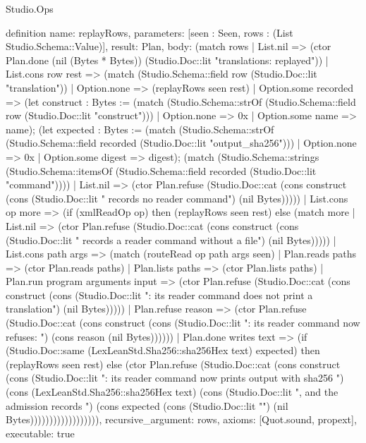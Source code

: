 \begin{lexlean}{Studio.Ops}
\begin{semanticmodule}
{definition{
  name: replayRows,
  parameters: [seen : Seen, rows : (List Studio.Schema::Value)],
  result: Plan,
  body: (match rows
    | List.nil => (ctor Plan.done (nil (Bytes * Bytes)) (Studio.Doc::lit "translations: replayed\n"))
    | List.cons row rest => (match (Studio.Schema::field row (Studio.Doc::lit "translation"))
      | Option.none => (replayRows seen rest)
      | Option.some recorded => (let construct : Bytes := (match (Studio.Schema::strOf (Studio.Schema::field row (Studio.Doc::lit "construct")))
          | Option.none => 0x
          | Option.some name => name); (let expected : Bytes := (match (Studio.Schema::strOf (Studio.Schema::field recorded (Studio.Doc::lit "output_sha256")))
          | Option.none => 0x
          | Option.some digest => digest); (match (Studio.Schema::strings (Studio.Schema::itemsOf (Studio.Schema::field recorded (Studio.Doc::lit "command"))))
          | List.nil => (ctor Plan.refuse (Studio.Doc::cat (cons construct (cons (Studio.Doc::lit " records no reader command\n") (nil Bytes)))))
          | List.cons op more => (if (xmlReadOp op) then (replayRows seen rest) else (match more
            | List.nil => (ctor Plan.refuse (Studio.Doc::cat (cons construct (cons (Studio.Doc::lit " records a reader command without a file\n") (nil Bytes)))))
            | List.cons path args => (match (routeRead op path args seen)
              | Plan.reads paths => (ctor Plan.reads paths)
              | Plan.lists paths => (ctor Plan.lists paths)
              | Plan.run program arguments input => (ctor Plan.refuse (Studio.Doc::cat (cons construct (cons (Studio.Doc::lit ": its reader command does not print a translation\n") (nil Bytes)))))
              | Plan.refuse reason => (ctor Plan.refuse (Studio.Doc::cat (cons construct (cons (Studio.Doc::lit ": its reader command now refuses: ") (cons reason (nil Bytes))))))
              | Plan.done writes text => (if (Studio.Doc::same (LexLeanStd.Sha256::sha256Hex text) expected) then (replayRows seen rest) else (ctor Plan.refuse (Studio.Doc::cat (cons construct (cons (Studio.Doc::lit ": its reader command now prints output with sha256 ") (cons (LexLeanStd.Sha256::sha256Hex text) (cons (Studio.Doc::lit ", and the admission records ") (cons expected (cons (Studio.Doc::lit "\n") (nil Bytes)))))))))))))))))),
  recursive_argument: rows,
  axioms: [Quot.sound, propext],
  executable: true
}

}
\end{semanticmodule}
\end{lexlean}
